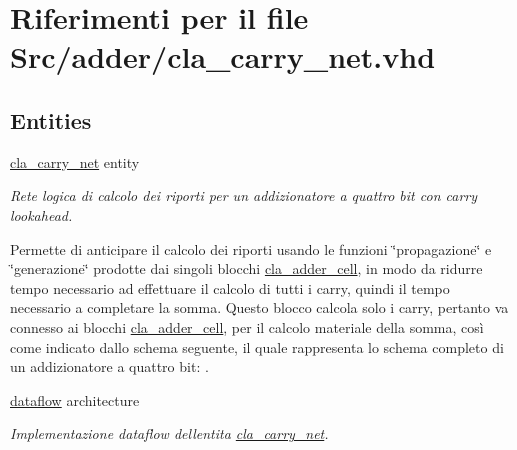 \hypertarget{cla__carry__net_8vhd}{}\section{Riferimenti per il file Src/adder/cla\+\_\+carry\+\_\+net.vhd}
\label{cla__carry__net_8vhd}
\subsection*{Entities}
\begin{DoxyCompactItemize}
\item 
\hyperlink{classcla__carry__net}{cla\+\_\+carry\+\_\+net} entity
\begin{DoxyCompactList}\small\item\em Rete logica di calcolo dei riporti per un addizionatore a quattro bit con carry lookahead.

Permette di anticipare il calcolo dei riporti usando le funzioni \char`\"{}propagazione\char`\"{} e \char`\"{}generazione\char`\"{} prodotte dai singoli blocchi \hyperlink{classcla__adder__cell}{cla\+\_\+adder\+\_\+cell}, in modo da ridurre tempo necessario ad effettuare il calcolo di tutti i carry, quindi il tempo necessario a completare la somma. Questo blocco calcola solo i carry, pertanto va connesso ai blocchi \hyperlink{classcla__adder__cell}{cla\+\_\+adder\+\_\+cell}, per il calcolo materiale della somma, così come indicato dallo schema seguente, il quale rappresenta lo schema completo di un addizionatore a quattro bit\+: . \end{DoxyCompactList}\item 
\hyperlink{classcla__carry__net_1_1dataflow}{dataflow} architecture
\begin{DoxyCompactList}\small\item\em Implementazione dataflow dell\textquotesingle{}entita\textquotesingle{} \hyperlink{classcla__carry__net}{cla\+\_\+carry\+\_\+net}.


\end{DoxyCompactList}
\end{DoxyCompactItemize}
